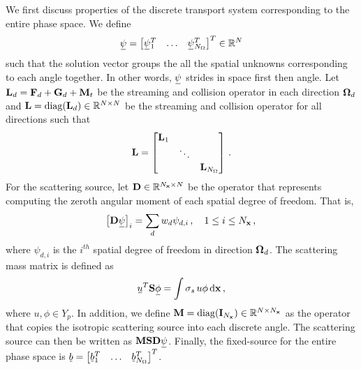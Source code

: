 \documentclass[../doc.tex]{subfiles}
\begin{document}
We first discuss properties of the discrete transport system corresponding to the entire phase space. We define 
	\begin{equation}
		\ubar{\psi} = \vector{\ubar{\psi}_1^T & \ldots & \ubar{\psi}_{N_\Omega}^T} \in \R^N 
	\end{equation}
such that the solution vector groups the all the spatial unknowns corresponding to each angle together. In other words, $\ubar{\psi}$ strides in space first then angle. 
Let $\boldsymbol{\mathrm{L}}_d = \boldsymbol{\mathrm{F}}_d + \boldsymbol{\mathrm{G}}_d + \boldsymbol{\mathrm{M}}_t$ be the streaming and collision operator in each direction $\boldsymbol{\Omega}_d$ and $\boldsymbol{\mathrm{L}} = \operatorname{diag}(\boldsymbol{\mathrm{L}}_d) \in \mathbb{R}^{N\times N}$ be the streaming and collision operator for all directions such that 
	\begin{equation}
		\boldsymbol{\mathrm{L}} = \begin{bmatrix} 
			\boldsymbol{\mathrm{L}}_1 \\ 
			& \ddots \\
			&& \boldsymbol{\mathrm{L}}_{N_\Omega}
		\end{bmatrix} \,. 
	\end{equation}
For the scattering source, let $\boldsymbol{\mathrm{D}} \in \mathbb{R}^{N_{\boldsymbol{\mathrm{x}}} \times N}$ be the operator that represents computing the zeroth angular moment of each spatial degree of freedom. That is, 
	\begin{equation}
		\bracket{\mat{D}\ubar{\psi}}_i = \sum_d w_d \psi_{d,i} \,, \quad 1 \leq i\leq N_{\x} \,,
	\end{equation}
where $\psi_{d,i}$ is the $i^{th}$ spatial degree of freedom in direction $\boldsymbol{\Omega}_d$. The scattering mass matrix is defined as 
	\begin{equation}
		\ubar{u}^T \mat{S} \ubar{\phi} = \int \sigma_s\, u\phi \ud \x \,, 
	\end{equation}
where $u,\phi \in Y_p$. In addition, we define $\boldsymbol{\mathrm{M}} = \operatorname{diag}(\boldsymbol{\mathrm{I}}_{N_{\boldsymbol{\mathrm{x}}}})\in \mathbb{R}^{N \times N_{\boldsymbol{\mathrm{x}}}}$ as the operator that copies the isotropic scattering source into each discrete angle. The scattering source can then be written as $\mat{M}\mat{S}\mat{D} \ubar{\psi}$. Finally, the fixed-source for the entire phase space is $\ubar{b} = \vector{\ubar{b}_1^T & \ldots & \ubar{b}_{N_\Omega}^T}$. 
\end{document}
